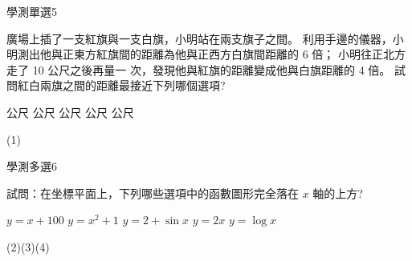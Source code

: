     \begin{QUESTION}
        \begin{ExamInfo}{97}{學測}{單選}{5}
        \end{ExamInfo}
        \begin{ExamAnsRateInfo}{41}{74}{32}{17}
        \end{ExamAnsRateInfo}
        \begin{QBODY}
            廣場上插了一支紅旗與一支白旗，小明站在兩支旗子之間。		利用手邊的儀器，小明測出他與正東方紅旗間的距離為他與正西方白旗間距離的 6 倍；			小明往正北方走了 10 公尺之後再量一 次，發現他與紅旗的距離變成他與白旗距離的 4 倍。			試問紅白兩旗之間的距離最接近下列哪個選項?
			\begin{QOPS} 
				 公尺 
				 公尺    
				 公尺 
				 公尺 
				 公尺
			\end{QOPS}
        \end{QBODY}
        \begin{QFROMS}
        \end{QFROMS}
        \begin{QTAGS}\end{QTAGS}
        \begin{QANS}
            (1)
        \end{QANS}
        \begin{QSOLLIST}
        \end{QSOLLIST}
        \begin{QEMPTYSPACE}
        \end{QEMPTYSPACE}
    \end{QUESTION}
    \begin{QUESTION}
        \begin{ExamInfo}{97}{學測}{多選}{6}
        \end{ExamInfo}
        \begin{ExamAnsRateInfo}{56}{92}{58}{18}
        \end{ExamAnsRateInfo}
        \begin{QBODY}
            試問：在坐標平面上，下列哪些選項中的函數圖形完全落在 $x$ 軸的上方? 
			\begin{QOPS} 
				\QOP $y=x+100$
				\QOP $y=x^2+1$ 
				\QOP $y=2+\sin x$
				\QOP $y=2x$
				\QOP $y=\log x$
			\end{QOPS}
        \end{QBODY}
        \begin{QFROMS}
        \end{QFROMS}
        \begin{QTAGS}\end{QTAGS}
        \begin{QANS}
            (2)(3)(4)
        \end{QANS}
        \begin{QSOLLIST}
        \end{QSOLLIST}
        \begin{QEMPTYSPACE}
        \end{QEMPTYSPACE}
    \end{QUESTION}
